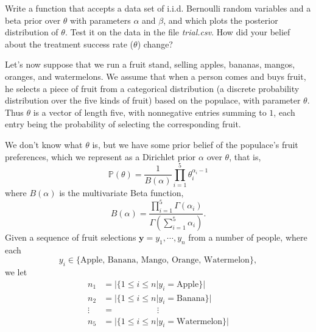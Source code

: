 \begin{problem}
Write a function that accepts a data set of i.i.d. Bernoulli random variables and a beta prior over $\theta$ with parameters $\alpha$ and $\beta$, and which plots the posterior distribution of $\theta$. Test it on the data in the file \emph{trial.csv}. How did your belief about the treatment success rate ($\theta$) change?
\end{problem}

Let's now suppose that we run a fruit stand, selling apples, bananas, mangos, oranges, and watermelons. We assume that when a person comes and buys fruit, he selects a piece of fruit from a categorical distribution (a discrete probability distribution over the five kinds of fruit) based on the populace, with parameter $\theta$. Thus $\theta$ is a vector of length five, with nonnegative entries summing to $1$, each entry being the probability of selecting the corresponding fruit.

We don't know what $\theta$ is, but we have some prior belief of the populace's fruit preferences, which we represent as a Dirichlet prior $\alpha$ over $\theta$, that is, $$\mathbb{P}(\theta) = \frac{1}{B(\alpha)} \prod_{i=1}^{5} \theta_{i}^{\alpha_{i} - 1}$$ where $B(\alpha)$ is the multivariate Beta function, $$B(\alpha) = \frac{\prod_{i=1}^{5} \Gamma(\alpha_{i})}{\Gamma(\sum_{i=1}^{5} \alpha_{i})}.$$ Given a sequence of fruit selections $\mathbf{y} = y_{1}, \cdots, y_{n}$ from a number of people, where each $$y_{i} \in \{\text{Apple, Banana, Mango, Orange, Watermelon}\},$$ we let 
\begin{align*}
n_{1} & = |\{1 \leq i \leq n | y_{i} = \text{Apple}\}| \\
n_{2} & = |\{1 \leq i \leq n | y_{i} = \text{Banana}\}| \\
\vdots & = \; \; \; \; \; \; \; \; \; \; \; \; \; \; \; \; \; \; \vdots \\
n_{5} & = |\{1 \leq i \leq n | y_{i} = \text{Watermelon}\}|
\end{align*}

